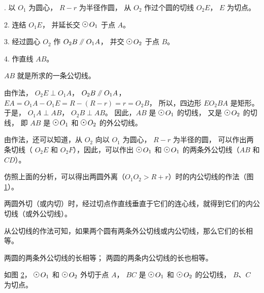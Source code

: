 . 以 $O_1$ 为圆心， $R-r$ 为半径作圆， 从 $O_2$ 作过个圆的切线 $O_2E$， $E$ 为切点。

2. 连结 $O_1E$， 并延长交 $\yuan\,O_1$ 于点 $A$。

3. 经过圆心 $O_2$ 作 $O_2B \pingxing O_1A$， 并交 $\yuan\,O_2$ 于点 $B$。

4. 作直线 $AB$。

$AB$ 就是所求的一条公切线。

\zhengming 由作法， $O_2E \perp O_1A$， $O_2B \pingxing O_1A$，
$EA = O_1A - O_1E = R - (R-r) = r = O_2B$，
所以，四边形 $EO_2BA$ 是矩形。于是， $O_1A \perp AB$， $O_2B \perp AB$。
因此，$AB$ 是 $\yuan\,O_1$ 的切线， 又是 $\yuan\,O_2$ 的切线，
即 $AB$ 是 $\yuan\,O_1$ 和 $\yuan\,O_2$ 的外公切线。

由作法，还可以知道，从 $O_2$ 向以 $O_1$ 为圆心， $R-r$ 为半径的圆，
可以作出两条切线（ $O_2E$ 和 $O_2F$），因此，可以作出 $\yuan\,O_1$ 和
$\yuan\,O_1$ 的两条外公切线（$AB$ 和 $CD$）。

\begin{figure}[htbp]
    \centering
    \begin{minipage}[b]{7cm}
        \centering
        
        \caption{}\label{fig:czjh2-7-55}
    \end{minipage}
    \qquad
    \begin{minipage}[b]{7.2cm}
        \centering
        
        \caption{}\label{fig:czjh2-7-56}
    \end{minipage}
\end{figure}

仿照上面的分析，可以得出两圆外离（$O_1O_2 > R+r$）时的内公切线的作法（图 \ref{fig:czjh2-7-56}）。

两圆外切（或内切）时，经过切点作直线垂直于它们的连心线，就得到它们的内公切线（或外公切线）。

从公切线的作法可知，如果两个圆有两条外公切线或内公切线，那么它们的长相等。

\begin{dingli}[定理]
    两圆的两条外公切线的长相等；
    两圆的两条内公切线的长也相等。
\end{dingli}


\begin{figure}
    \centering
    
    \caption{}\label{fig:czjh2-7-57}
\end{figure}

\liti[0] 如图 \ref{fig:czjh2-7-57}， $\yuan\,O_1$ 和 $\yuan\,O_2$ 外切于点 $A$，
$BC$ 是 $\yuan\,O_1$ 和 $\yuan\,O_2$ 的公切线， $B$、$C$ 为切点。

